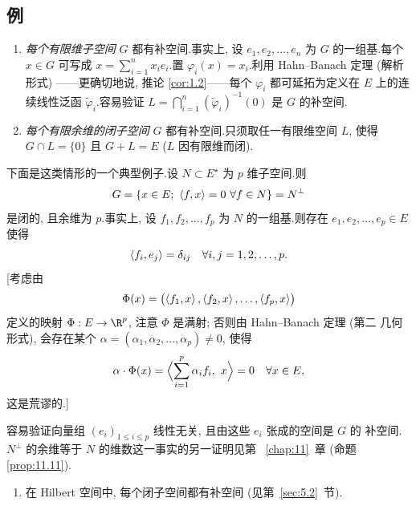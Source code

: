 \subsection*{例}

\begin{enumerate}[label=\arabic*., leftmargin=2.2em, itemsep=0.5em]
	\item \emph{每个有限维子空间} $G$ 都有补空间.事实上, 设 $e_1,e_2,\dots,e_n$ 为
	      $G$ 的一组基.每个 $x\in G$ 可写成 $x=\sum_{i=1}^n x_ie_i$.置
	      $\varphi_i(x)=x_i$.利用 Hahn--Banach 定理 (解析形式) ——更确切地说, 推论
	       \ref{cor:1.2}——每个 $\varphi_i$ 都可延拓为定义在 $E$ 上的连续线性泛函
	      $\widetilde{\varphi}_i$.容易验证
	      $L=\bigcap_{i=1}^n(\widetilde{\varphi}_i)^{-1}(0)$ 是 $G$ 的补空间.
	\item \emph{每个有限余维的闭子空间} $G$ 都有补空间.只须取任一有限维空间 $L$,
	      使得 $G\cap L=\{0\}$ 且 $G+L=E$ ($L$ 因有限维而闭).
\end{enumerate}

下面是这类情形的一个典型例子.设 $N\subset E^\star$ 为 $p$ 维子空间.则
\begin{equation*}
G=\{x\in E;\ \dual{f}{x}=0\ \forall f\in N\}=N^\perp
\end{equation*}
是闭的, 且余维为 $p$.事实上, 设 $f_1,f_2,\dots,f_p$ 为 $N$ 的一组基.则存在
$e_1,e_2,\dots,e_p\in E$ 使得
\begin{equation*}
\left\langle f_i,e_j\right\rangle=\delta_{ij}\quad \forall i,j=1,2,\dots,p.
\end{equation*}
[考虑由
\begin{equation}
\Phi(x)=\bigl(\left\langle f_1,x\right\rangle,\left\langle f_2,x\right\rangle,\dots,\left\langle f_p,x\right\rangle\bigr)
\label{eq:2.15}
\end{equation}
定义的映射 $\Phi:E\to\R^p$, 注意 $\Phi$ 是满射; 否则由 Hahn--Banach 定理 (第二
几何形式), 会存在某个 $\alpha=(\alpha_1,\alpha_2,\dots,\alpha_p)\ne0$, 使得
\begin{equation*}
\alpha\cdot\Phi(x)=\Bigl\langle\sum_{i=1}^p\alpha_if_i,\ x\Bigr\rangle=0
\quad \forall x\in E,
\end{equation*}
这是荒谬的.]

容易验证向量组 $(e_i)_{1\le i\le p}$ 线性无关, 且由这些 $e_i$ 张成的空间是 $G$ 的
补空间.$N^\perp$ 的余维等于 $N$ 的维数这一事实的另一证明见第~
\ref{chap:11}~章 (命题~
\ref{prop:11.11}).

\begin{enumerate}[label=\arabic*., leftmargin=2.2em, itemsep=0.5em, start=3]
	\item 在 Hilbert 空间中, 每个闭子空间都有补空间 (见第~\ref{sec:5.2}~节).
\end{enumerate}

